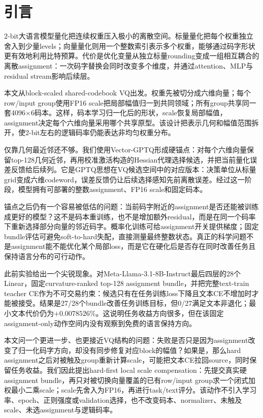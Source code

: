 \section{引言}

2-bit大语言模型量化把连续权重压入极小的离散空间。标量量化把每个权重独立舍入到少量levels；向量量化则用一个整数索引表示多个权重，能够通过码字形状更有效地利用比特预算。代价是优化变量从独立标量rounding变成一组相互耦合的离散assignment：一次码字替换会同时改变多个维度，并通过attention、MLP与residual stream影响后续层。

本文从block-scaled shared-codebook VQ出发。权重先被切分成六维向量；每个row/input group使用FP16 scale把局部幅值归一到共同领域；所有group共享同一套4096$\times$6码本。这样，码本学习归一化后的形状，scale恢复局部幅值，assignment决定每个六维向量采用哪个共享原型。该设计把表示几何和幅值范围拆开，使2-bit左右的逻辑码率仍能表达非均匀权重分布。

仅靠几何最近邻还不够。我们使用Vector-GPTQ形成硬锚点：对每个六维向量保留top-128几何近邻，再用校准激活构造的Hessian代理选择候选，并把当前量化误差反馈给后续列。它是GPTQ思想在VQ候选空间中的对应版本：决策单位从标量grid变成六维codeword，误差反馈仍让后续选择感知先前离散误差。经过这一阶段，模型拥有可部署的整数assignment、FP16 scale和固定码本。

锚点之后仍有一个容易被低估的问题：当前码字附近的assignment是否还能被训练成更好的模型？这不是码本重训练，也不是增加额外residual，而是在同一个码率下重新选择部分向量的邻近码字。概率化训练可给assignment开关提供梯度；固定bundle评估可避免soft-to-hard失配，直接测量最终整数状态。真正的科学问题不是assignment能不能优化某个局部loss，而是它在硬化后是否存在同时改善任务且保持语言分布的可行动作。

此前实验给出一个尖锐现象。对Meta-Llama-3.1-8B-Instruct最后四层的28个Linear，固定curvature-ranked top-128 assignment bundle，并把完整text-train teacher CE作为不可交易约束：候选只有在任务训练loss下降且文本CE不增加时才能被接受。结果是27/28个bundle改善任务训练目标，但0/27满足文本非退化；最小文本代价仍为$+0.0078526\%$。这说明任务收益方向很多，但在该固定assignment-only动作空间内没有观察到免费的语言保持方向。

本文问一个更进一步、也更接近VQ结构的问题：失败是否只是因为assignment改变了归一化码字方向，却没有同步修复对应block的幅值？如果是，那么hard assignment之后对被触及group重新计算scale，可能把文本CE拉回source，同时保留任务收益。我们因此提出hard-first local scale compensation：先提交真实硬assignment bundle，再只对被切换向量覆盖的已有row/input group求一个闭式加权最小二乘scale；scale先舍入为FP16，再进行task/text评分。该动作不引入学习率、epoch、正则强度或validation选择，也不改变码本、normalizer、未触及scale、未选assignment与逻辑码率。

